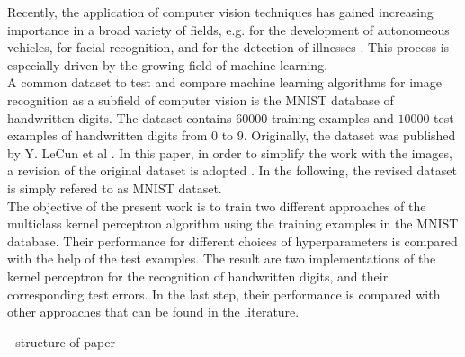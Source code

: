Recently, the application of computer vision techniques has gained increasing importance in a broad variety of fields, e.g. for the development of autonomeous vehicles, for facial recognition, and for the detection of illnesses \cite{autonomeous2020, emotion2020, medicine2021}. This process is especially driven by the growing field of machine learning. \\

A common dataset to test and compare machine learning algorithms for image recognition as a subfield of computer vision is the MNIST database of handwritten digits. The dataset contains $60000$ training examples and $10000$ test examples of handwritten digits from $0$ to $9$. Originally, the dataset was published by Y. LeCun et al \cite{MNIST}. In this paper, in order to simplify the work with the images, a revision of the original dataset is adopted \cite{KaggleData}. In the following, the revised dataset is simply refered to as MNIST dataset. \\

The objective of the present work is to train two different approaches of the multiclass kernel perceptron algorithm using the training examples in the MNIST database. Their performance for different choices of hyperparameters is compared with the help of the test examples. The result are two implementations of the kernel perceptron for the recognition of handwritten digits, and their corresponding test errors. In the last step, their performance is compared with other approaches that can be found in the literature.

- structure of paper